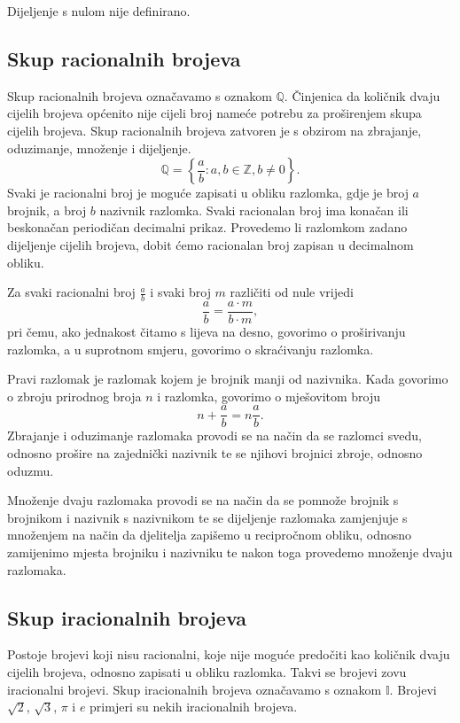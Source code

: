 Dijeljenje s nulom nije definirano.

\subsection{Skup racionalnih brojeva}\label{subsec:skup-racionalnih-brojeva}
Skup racionalnih brojeva označavamo s oznakom $\mathbb{Q}$.
Činjenica da količnik dvaju cijelih brojeva općenito nije cijeli broj nameće potrebu za proširenjem skupa cijelih brojeva.
Skup racionalnih brojeva zatvoren je s obzirom na zbrajanje, oduzimanje, množenje i dijeljenje.
\[ \mathbb{Q}=\left\{\frac{a}{b} : a,b \in \mathbb{Z}, b \neq 0 \right\}. \]
Svaki je racionalni broj je moguće zapisati u obliku razlomka, gdje je broj $a$ brojnik, a broj $b$ nazivnik razlomka.
Svaki racionalan broj ima konačan ili beskonačan periodičan decimalni prikaz.
Provedemo li razlomkom zadano dijeljenje cijelih brojeva, dobit ćemo racionalan broj zapisan u decimalnom obliku.

Za svaki racionalni broj $\displaystyle \frac{a}{b}$ i svaki broj $m$ različiti od nule vrijedi
\[ \frac{a}{b} = \frac{a \cdot m}{b \cdot m}, \]
pri čemu, ako jednakost čitamo s lijeva na desno, govorimo o proširivanju razlomka, a u suprotnom smjeru, govorimo o skraćivanju razlomka.

Pravi razlomak je razlomak kojem je brojnik manji od nazivnika.
Kada govorimo o zbroju prirodnog broja $n$ i razlomka, govorimo o mješovitom broju
\[ n + \frac{a}{b} = n\frac{a}{b}. \]
Zbrajanje i oduzimanje razlomaka provodi se na način da se razlomci svedu, odnosno prošire na zajednički nazivnik te se njihovi brojnici zbroje, odnosno oduzmu.

Množenje dvaju razlomaka provodi se na način da se pomnože brojnik s brojnikom i nazivnik s nazivnikom te se dijeljenje razlomaka zamjenjuje s množenjem na način da djelitelja zapišemo u recipročnom obliku, odnosno zamijenimo mjesta brojniku i nazivniku te nakon toga provedemo množenje dvaju razlomaka.

\subsection{Skup iracionalnih brojeva}\label{subsec:skup-iracionalnih-brojeva}
Postoje brojevi koji nisu racionalni, koje nije moguće predočiti kao količnik dvaju cijelih brojeva, odnosno zapisati u obliku razlomka.
Takvi se brojevi zovu iracionalni brojevi.
Skup iracionalnih brojeva označavamo s oznakom $\mathbb{I}$.
Brojevi $\sqrt{2}$, $\sqrt{3}$, $\pi$ i $e$  primjeri su nekih iracionalnih brojeva.

